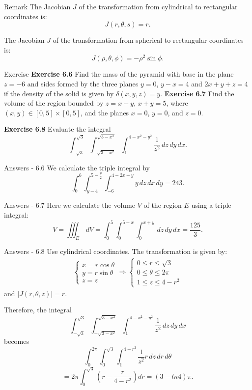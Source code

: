 \documentclass{beamer}
\begin{document}
\begin{frame}{Remark}
    The Jacobian \( J \) of the transformation from cylindrical to rectangular coordinates is:
\[ J(r, \theta, s) = r. \]

The Jacobian \( J \) of the transformation from spherical to rectangular coordinates is:
\[ J(\rho, \theta, \phi) = -\rho^2 \sin \phi. \]
\end{frame}
\begin{frame}{Exercise}
    \textbf{Exercise 6.6} Find the mass of the pyramid with base in the plane $z = -6$ and sides
formed by the three planes $y = 0$, $y - x = 4$ and $2x + y + z = 4$
if the density of the solid is given by $\delta(x, y, z) = y$.
    \textbf{Exercise 6.7} Find the volume of the region bounded by $z = x + y$, $x + y = 5$,
where $(x, y) \in [0, 5] \times [0, 5]$, and the planes $x = 0$, $y = 0$, and $z = 0$.

    \textbf{Exercise 6.8} Evaluate the integral
\[
\int_{-\sqrt{3}}^{\sqrt{3}} \int_{-\sqrt{3-x^2}}^{\sqrt{3-x^2}} \int_{1}^{4-x^2-y^2} \frac{1}{z^2} \, dz \, dy \, dx.
\]
\end{frame}
\begin{frame}{Answers - 6.6}
    We calculate the triple integral by
\[
\int_{0}^{6} \int_{y-4}^{5-\frac{y}{2}} \int_{-6}^{4-2x-y} y \, dz \, dx \, dy = 243.
\]
\end{frame}
\begin{frame}{Answers - 6.7}
    Here we calculate the volume $V$ of the region $E$ using a triple integral:
\[
V = \iiint_E \, dV = \int_0^5 \int_0^{5-x} \int_0^{x+y} \, dz \, dy \, dx = \frac{125}{3}.
\]

\end{frame}
\begin{frame}{Answers - 6.8}
    Use cylindrical coordinates. The transformation is given by:
\begin{align*}
\begin{cases}
x = r \cos \theta \\
y = r \sin \theta \\
z = z
\end{cases}
\Rightarrow
\begin{cases}
0 \leq r \leq \sqrt{3} \\
0 \leq \theta \leq 2\pi \\
1 \leq z \leq 4 - r^2
\end{cases}
\end{align*}
and $|J(r, \theta, z)| = r$.

Therefore, the integral
\[
\int_{-\sqrt{3}}^{\sqrt{3}} \int_{-\sqrt{3-x^2}}^{\sqrt{3-x^2}} \int_{1}^{4-x^2-y^2} \frac{1}{z^2} \, dz \, dy \, dx
\]
becomes
\[
\int_{0}^{2\pi} \int_{0}^{\sqrt{3}} \int_{1}^{4-r^2} \frac{1}{z^2} r \, dz \, dr \, d\theta 
\]
\[ 
= 2\pi \int_{0}^{\sqrt{3}} \left( r - \frac{r}{4 - r^2} \right) dr =(3-ln 4) \pi.
\]
\end{frame}
\end{document}
